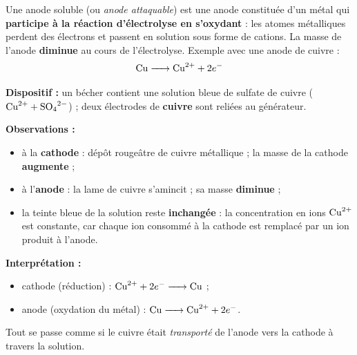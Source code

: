 \documentclass[11pt]{article}
\newcommand{\cle}[1]{{\popxbold\color{popdark}#1}}
\begin{document}
\begin{definition}
Une \cle{anode soluble} (ou \emph{anode attaquable}) est une anode constituée d'un métal qui \textbf{participe à la réaction d'électrolyse en s'oxydant} : les atomes métalliques perdent des électrons et passent en solution sous forme de cations. La masse de l'anode \textbf{diminue} au cours de l'électrolyse. Exemple avec une anode de cuivre :
\[ \ce{Cu} \ce{->} \ce{Cu^2+} + 2e^- \]
\end{definition}

\begin{experience}
\textbf{Dispositif :} un bécher contient une solution bleue de sulfate de cuivre ($\ce{Cu^2+} + \ce{SO4^2-}$) ; deux électrodes de \textbf{cuivre} sont reliées au générateur.

\textbf{Observations :}
\begin{itemize}
\item à la \textbf{cathode} : dépôt rougeâtre de cuivre métallique ; la masse de la cathode \textbf{augmente} ;
\item à l'\textbf{anode} : la lame de cuivre s'amincit ; sa masse \textbf{diminue} ;
\item la teinte bleue de la solution reste \textbf{inchangée} : la concentration en ions $\ce{Cu^2+}$ est constante, car chaque ion consommé à la cathode est remplacé par un ion produit à l'anode.
\end{itemize}

\textbf{Interprétation :}
\begin{itemize}
\item cathode (réduction) : $\ce{Cu^2+} + 2e^- \ce{->} \ce{Cu}$ ;
\item anode (oxydation du métal) : $\ce{Cu} \ce{->} \ce{Cu^2+} + 2e^-$.
\end{itemize}
Tout se passe comme si le cuivre était \emph{transporté} de l'anode vers la cathode à travers la solution.
\end{experience}
\end{document}
